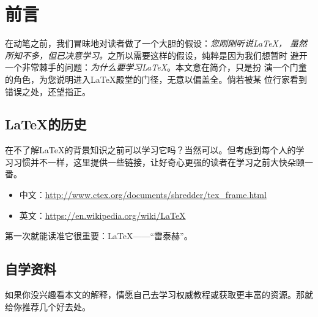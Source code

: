 \section{前言}

在动笔之前，我们冒昧地对读者做了一个大胆的假设：\emph{您刚刚听说\LaTeX{}，
  虽然所知不多，但已决意学习。}之所以需要这样的假设，纯粹是因为我们想暂时
避开一个非常棘手的问题：\emph{为什么要学习\LaTeX{}}。本文意在简介，只是扮
演一个门童的角色，为您说明进入\LaTeX{}殿堂的门径，无意以偏盖全。倘若被某
位行家看到错误之处，还望指正。



\subsection{\LaTeX{}的历史}

在不了解\LaTeX{}的背景知识之前可以学习它吗？当然可以。但考虑到每个人的学
习习惯并不一样，这里提供一些链接，让好奇心更强的读者在学习之前大快朵颐一
番。

\begin{itemize}
\item 中文：\url{http://www.ctex.org/documents/shredder/tex_frame.html}
\item 英文：\url{https://en.wikipedia.org/wiki/LaTeX}
\end{itemize}

第一次就能读准它很重要：\LaTeX{}——“雷泰赫”。

\subsection{自学资料}

如果你没兴趣看本文的解释，情愿自己去学习权威教程或获取更丰富的资源。那就
给你推荐几个好去处。


